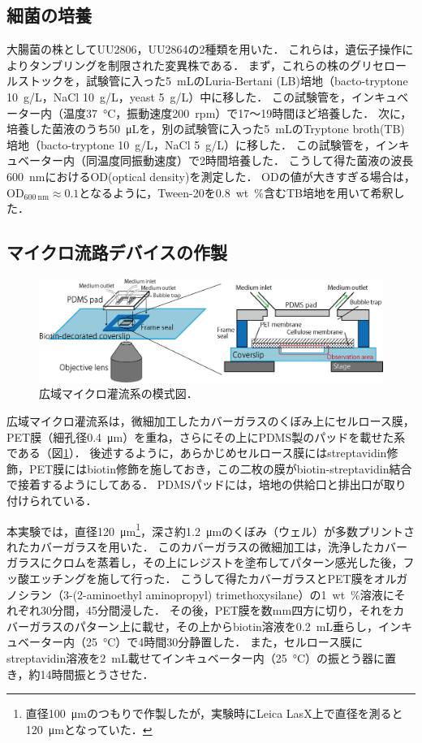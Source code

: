 \documentclass[a4paper,11pt,titlepage]{jsarticle}
\begin{document}
\subsection{細菌の培養}
大腸菌の株としてUU2806，UU2864の2種類を用いた．
これらは，遺伝子操作によりタンブリングを制限された変異株である．
まず，これらの株のグリセロールストックを，試験管に入った\SI{5}{\mL}のLuria-Bertani (LB)培地（bacto-tryptone \SI{10}{\g/\L}，NaCl \SI{10}{\g/\L}，yeast \SI{5}{\g/\L}）中に移した．
この試験管を，インキュベーター内（温度\SI{37}{\degreeCelsius}，振動速度\SI{200}{rpm}）で17～19時間ほど培養した．
次に，培養した菌液のうち\SI{50}{\uL}を，別の試験管に入った\SI{5}{\mL}のTryptone broth(TB)培地（bacto-tryptone \SI{10}{\g/\L}，NaCl \SI{5}{\g/\L}）に移した．
この試験管を，インキュベーター内（同温度同振動速度）で2時間培養した．
こうして得た菌液の波長\SI{600}{\nm}におけるOD(optical density)を測定した．
ODの値が大きすぎる場合は，$\mathrm{OD}_{\SI{600}{\nm}}\approx 0.1$となるように，Tween-20を\SI{0.8}{wt\%}含むTB培地を用いて希釈した．

\subsection{マイクロ流路デバイスの作製}

\begin{figure}[htbp]
  \centering
  \includegraphics[width=13cm]{EMPS.png}
  \caption{広域マイクロ灌流系の模式図\cite{emps}．}
  \label{fig:EMPS}
\end{figure}

広域マイクロ灌流系は，微細加工したカバーガラスのくぼみ上にセルロース膜，PET膜（細孔径\SI{0.4}{\um}）を重ね，さらにその上にPDMS製のパッドを載せた系である（図\ref{fig:EMPS}）．
後述するように，あらかじめセルロース膜にはstreptavidin修飾，PET膜にはbiotin修飾を施しておき，この二枚の膜がbiotin-streptavidin結合で接着するようにしてある．
PDMSパッドには，培地の供給口と排出口が取り付けられている．

本実験では，直径\SI{120}{\um}\footnote{直径\SI{100}{\um}のつもりで作製したが，実験時にLeica LasX上で直径を測ると\SI{120}{\um}となっていた．}，深さ約\SI{1.2}{\um}のくぼみ（ウェル）が多数プリントされたカバーガラスを用いた．
このカバーガラスの微細加工は，洗浄したカバーガラスにクロムを蒸着し，その上にレジストを塗布してパターン感光した後，フッ酸エッチングを施して行った．
こうして得たカバーガラスとPET膜をオルガノシラン（3-(2-aminoethyl aminopropyl) trimethoxysilane）の\SI{1}{wt\%}溶液にそれぞれ30分間，45分間浸した．
その後，PET膜を数mm四方に切り，それをカバーガラスのパターン上に載せ，その上からbiotin溶液を\SI{0.2}{\mL}垂らし，インキュベーター内（\SI{25}{\degreeCelsius}）で4時間30分静置した．
また，セルロース膜にstreptavidin溶液を\SI{2}{\mL}載せてインキュベーター内（\SI{25}{\degreeCelsius}）の振とう器に置き，約14時間振とうさせた．
\end{document}
